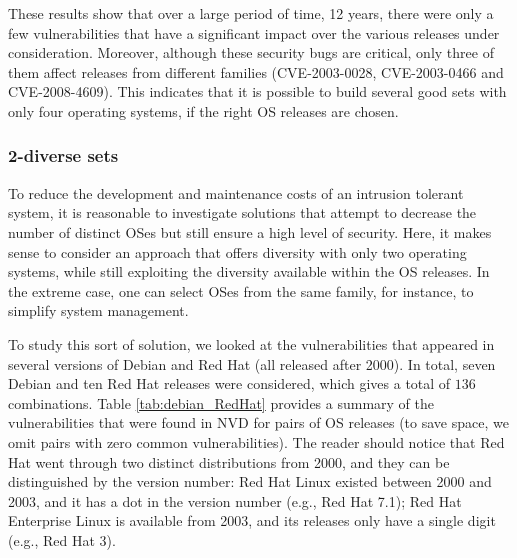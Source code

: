 These results show that over a large period of time, 12 years, there were only a few vulnerabilities that have a significant impact over the various releases under consideration. Moreover, although these security bugs are critical, only three of them affect releases from different families (CVE-2003-0028, CVE-2003-0466 and CVE-2008-4609). This indicates that it is possible to build several good sets with only four operating systems, if the right OS releases are chosen.


\subsubsection*{2-diverse sets} To reduce the development and maintenance costs of an intrusion tolerant system, it is reasonable to investigate solutions that attempt to decrease the number of distinct OSes but still ensure a high level of security. Here, it makes sense to consider an approach that offers diversity with only two operating systems, while still exploiting the diversity available within the OS releases. In the extreme case, one can select OSes from the same family, for instance, to simplify system management.

To study this sort of solution, we looked at the vulnerabilities that appeared in several versions of Debian and Red Hat (all released after 2000). In total, seven Debian and ten Red Hat releases were considered, which gives a total of $136$ combinations. Table \ref{tab:debian_RedHat} provides a summary of the vulnerabilities that were found in NVD for pairs of OS releases (to save space, we omit pairs with zero common vulnerabilities). The reader should notice that Red Hat went through two distinct distributions from 2000, and they can be distinguished by the version number: Red Hat Linux existed between 2000 and 2003, and it has a dot in the version number (e.g., Red Hat 7.1); Red Hat Enterprise Linux is available from 2003, and its releases only have a single digit (e.g., Red Hat 3).

